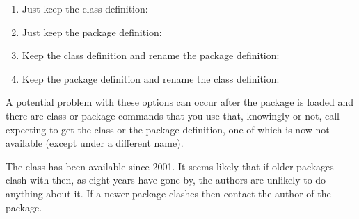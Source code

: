 \begin{enumerate}

\item Just keep the class definition:

\item Just keep the package definition:

\item Keep the class definition and rename the package definition:

\item Keep the package definition and rename the class definition:

\end{enumerate}

    A potential problem with these options can occur after the package is
loaded and there are class or package commands that you use that, 
knowingly or not, 
call  expecting to get the class or the package definition, one of
which is now not available (except under a different name).

    The  class has been available since 2001. It seems likely
that if older packages clash with  then, as eight years have
gone by, the authors are unlikely to do anything about it. If a newer 
package clashes then contact the author of the package. 

